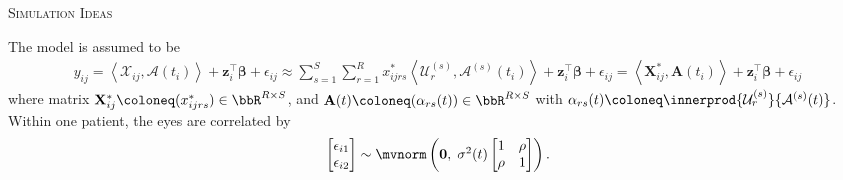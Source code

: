 \documentclass[10pt]{notes}
\begin{document}
\thispagestyle{firstpage}
\begin{center}
    \large\textsc{Simulation Ideas}
\end{center}

The model is assumed to be
\begin{align}
\label{eq-model0}
y_{ij}
= \left\langle \mathcal{X}_{ij}, \mathcal{A}(t_i) \right\rangle
+ \mathbf{z}_i^\top \boldsymbol{\beta} + \epsilon_{ij}
\approx \sum_{s=1}^S \sum_{r=1}^R
   x_{ijrs}^{*}
   \left\langle
   \mathcal{U}_r^{(s)},
   \mathcal{A}^{(s)}(t_i)
   \right\rangle
   + \mathbf{z}_i^\top \boldsymbol{\beta}
   + \epsilon_{ij} 
= \left\langle \mathbf{X}_{ij}^{*}, \mathbf{A}(t_i) \right\rangle
   + \mathbf{z}_i^\top \boldsymbol{\beta}
   + \epsilon_{ij}
\end{align}
where matrix $\mathbf{X}_{ij}^{*}\coloneq(x_{ijrs}^*)\in\bbR^{R\times S}$, and $\mathbf{A}(t)\coloneq (\alpha_{rs}(t))\in\bbR^{R\times S}$ with $\alpha_{rs}(t)\coloneq \innerprod{\mathcal{U}_r^{(s)}}{\mathcal{A}^{(s)}(t)}$. Within one patient, the eyes are correlated by
\begin{align*}
    \begin{bmatrix}
        \epsilon_{i1}\\ \epsilon_{i2}
    \end{bmatrix}\sim 
    \mvnorm\begin{pmatrix}
        \mathbf{0},\; \sigma^2(t)\begin{bmatrix}
            1 & \rho\\ 
            \rho & 1
        \end{bmatrix}
    \end{pmatrix}.
\end{align*}
\end{document}
